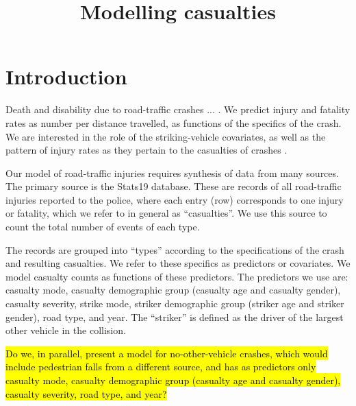 \documentclass{article}
\title{Modelling casualties}
\begin{document}
\maketitle


\section{Introduction}

Death and disability due to road-traffic crashes ... . We predict injury and fatality rates as number per distance travelled, as functions of the specifics of the crash. We are interested in the role of the striking-vehicle covariates, as well as the pattern of injury rates as they pertain to the casualties of crashes \citep{Feleke2017,Scholes2017a}.

Our model of road-traffic injuries requires synthesis of data from many sources. The primary source is the Stats19 database. These are records of all road-traffic injuries reported to the police, where each entry (row) corresponds to one injury or fatality, which we refer to in general as ``casualties''. We use this source to count the total number of events of each type.

The records are grouped into ``types'' according to the specifications of the crash and resulting casualties. We refer to these specifics as predictors or covariates. We model casualty counts as functions of these predictors. The predictors we use are: casualty mode, casualty demographic group (casualty age and casualty gender), casualty severity, strike mode, striker demographic group (striker age and striker gender), road type, and year. The ``striker'' is defined as the driver of the largest other vehicle in the collision.

\hl{Do we, in parallel, present a model for no-other-vehicle crashes, which would include pedestrian falls from a different source, and has as predictors only casualty mode, casualty demographic group (casualty age and casualty gender), casualty severity, road type, and year?} \citep{Methorst2017,Ward2005}
\end{document}
